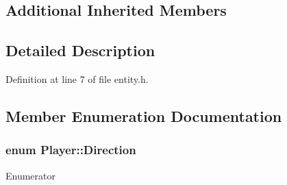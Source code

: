 \subsection*{Additional Inherited Members}


\subsection{Detailed Description}


Definition at line 7 of file entity.\-h.



\subsection{Member Enumeration Documentation}
\hypertarget{class_player_ad1b5932229b5d87c3dbca5bfcacb6936}{
\subsubsection[{Direction}]{\setlength{\rightskip}{0pt plus 5cm}enum {\bf Player\-::\-Direction}}}\label{class_player_ad1b5932229b5d87c3dbca5bfcacb6936}
\begin{Desc}
\item[Enumerator]\par
\begin{description}
\item[{\em 
\hypertarget{class_player_ad1b5932229b5d87c3dbca5bfcacb6936a086ad5e6686e1540d2e0a09ca9ffc624}{Up}\label{class_player_ad1b5932229b5d87c3dbca5bfcacb6936a086ad5e6686e1540d2e0a09ca9ffc624}
}]\item[{\em 
\hypertarget{class_player_ad1b5932229b5d87c3dbca5bfcacb6936af654e304331768c532162a09347a597f}{Down}\label{class_player_ad1b5932229b5d87c3dbca5bfcacb6936af654e304331768c532162a09347a597f}
}]\item[{\em 
\hypertarget{class_player_ad1b5932229b5d87c3dbca5bfcacb6936a21686ef8708bbb74f922069e23f2f2cf}{Front}\label{class_player_ad1b5932229b5d87c3dbca5bfcacb6936a21686ef8708bbb74f922069e23f2f2cf}
}]\item[{\em 
\hypertarget{class_player_ad1b5932229b5d87c3dbca5bfcacb6936aa5ce1f24920b0fe17104ab08a9afb07a}{Back}\label{class_player_ad1b5932229b5d87c3dbca5bfcacb6936aa5ce1f24920b0fe17104ab08a9afb07a}
}]\end{description}
\end{Desc}


